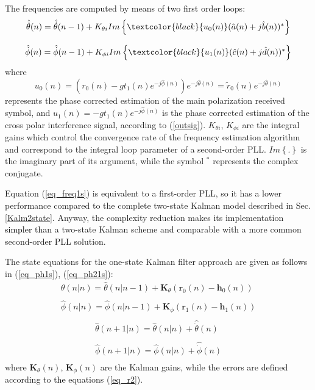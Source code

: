 The frequencies are computed by means of two first order loops:
\begin{equation}
\begin{array}{c}
\hat{\dot{\theta}}(n)=\hat{\dot{\theta}}(n-1)+K_{\theta i}Im\left\lbrace \textcolor{black}{u_0(n)}(\hat{a}(n)+j\hat{b}(n))^*\right\rbrace \\
\\
\hat{\dot{\phi}}(n)=\hat{\dot{\phi}}(n-1)+K_{\phi i}Im\left\lbrace \textcolor{black}{u_1(n)}(\hat{c}(n)+j\hat{d}(n))^*\right\rbrace \\
\label{eq_freq1s}
\end{array}
\end{equation}
where 
\begin{equation}
u_0(n)=(r_0(n)-gt_1(n)e^{-j\hat{\phi}(n)})e^{-j\hat{\theta}(n)}=\tilde{r}_0(n)e^{-j\hat{\theta}(n)}
\end{equation}
represents the phase corrected estimation of the main polarization received symbol, and $u_1(n)=-gt_1(n)e^{-j\hat{\phi}(n)}$ is the phase corrected estimation of the cross polar interference signal, according to (\ref{outsig}). $K_{\theta i}$, $K_{\phi i}$ are the integral gains which control the convergence rate of the frequency estimation algorithm and correspond to the integral loop parameter of a second-order PLL. $Im\left\lbrace . \right\rbrace $ is the imaginary part of its argument, while the symbol $^*$ represents the complex conjugate.

Equation (\ref{eq_freq1s}) is equivalent to a first-order PLL, so it has a lower performance compared to the complete two-state Kalman model described in Sec. \ref{Kalm2state}. Anyway, the complexity reduction makes its implementation \textcolor{black}{simpler} than a two-state Kalman scheme and comparable with a more common second-order PLL solution. 

The state equations for the one-state Kalman filter approach are given as follows in (\ref{eq_ph1s}), (\ref{eq_ph21s}):
\begin{equation}
\begin{array}{c}
\hat{\theta}(n|n)=\hat{\theta}(n|n-1)+\mathbf{K}_{\theta}\left(\mathbf{r}_0(n)-\mathbf{h}_0(n)\right)\\
\\
\hat{\phi}(n|n)=\hat{\phi}(n|n-1)+\mathbf{K}_{\phi}\left(\mathbf{r}_1(n)-\mathbf{h}_1(n)\right)\\
\label{eq_ph1s}
\end{array}
\end{equation}
\begin{equation}
\begin{array}{c}
\hat{\theta}(n+1|n)=\hat{\theta}(n|n)+\hat{\dot{\theta}}(n)\\
\\
\hat{\phi}(n+1|n)=\hat{\phi}(n|n)+\hat{\dot{\phi}}(n)\\
\label{eq_ph21s}
\end{array}
\end{equation}
where $\mathbf{K}_{\theta}(n)$, $\mathbf{K}_{\phi}(n)$ are the Kalman gains, while the errors are defined according to \textcolor{black}{the }equations (\ref{eq_r2}).

